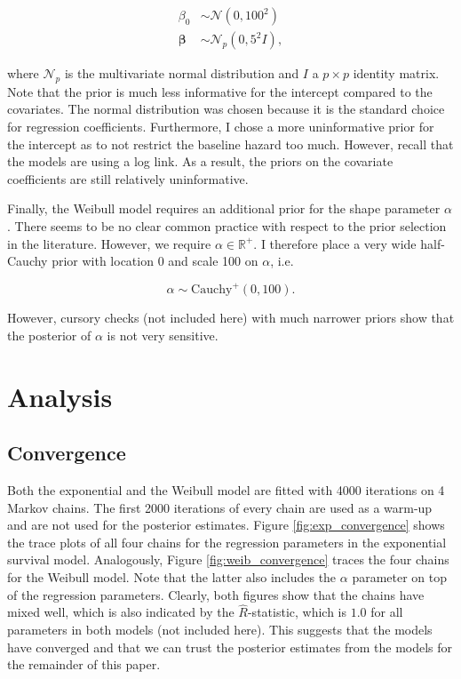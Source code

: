 \documentclass[11pt]{article}
\begin{document}
\begin{align*}
    \beta_0 &\sim \mathcal{N}(0, 100^2) \\
    \bm{\beta} &\sim \mathcal{N}_{p}(0, 5^2I),
\end{align*}

where $\mathcal{N}_p$ is the multivariate normal distribution and $I$ a $p\times p$ identity matrix. Note that the prior is much less informative for the intercept compared to the covariates. The normal distribution was chosen because it is the standard choice for regression coefficients. Furthermore, I chose a more uninformative prior for the intercept as to not restrict the baseline hazard too much. However, recall that the models are using a log link. As a result, the priors on the covariate coefficients are still relatively uninformative.

Finally, the Weibull model requires an additional prior for the shape parameter $\alpha$. There seems to be no clear common practice with respect to the prior selection in the literature. However, we require $\alpha \in \mathbb{R}^+$. I therefore place a very wide half-Cauchy prior with location 0 and scale 100 on $\alpha$, i.e. 

$$
\alpha \sim \text{Cauchy}^+(0, 100). 
$$

However, cursory checks (not included here) with much narrower priors show that the posterior of $\alpha$ is not very sensitive. 

\section{Analysis}
\subsection{Convergence}
Both the exponential and the Weibull model are fitted with 4000 iterations on 4 Markov chains. The first 2000 iterations of every chain are used as a warm-up and are not used for the posterior estimates. Figure \ref{fig:exp_convergence} shows the trace plots of all four chains for the regression parameters in the exponential survival model. Analogously, Figure \ref{fig:weib_convergence} traces the four chains for the Weibull model. Note that the latter also includes the $\alpha$ parameter on top of the regression parameters. Clearly, both figures show that the chains have mixed well, which is also indicated by the $\hat{R}$-statistic, which is $1.0$ for all parameters in both models (not included here). This suggests that the models have converged and that we can trust the posterior estimates from the models for the remainder of this paper. 
\end{document}
